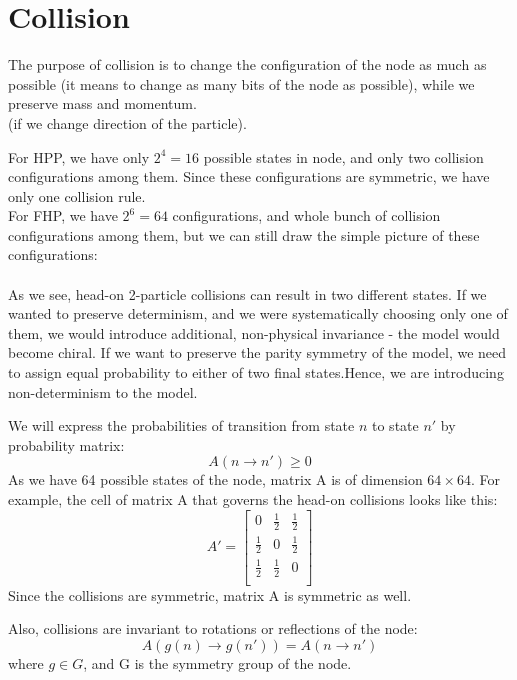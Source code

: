 \section{Collision}
The purpose of collision is to change the configuration of the node as much as possible (it means to change as many bits of the node as possible), while we preserve mass and momentum.\\
(if we change direction of the particle). 

For HPP, we have only $2^4 = 16$ possible states in node, and only two collision configurations among them. Since these configurations are symmetric, we have only one collision rule.\\
For FHP, we have $2^6 = 64$ configurations, and whole bunch of collision configurations among them, but we can still draw the simple picture of these configurations:\\
\\
As we see, head-on 2-particle collisions can result in two different states. If we wanted to preserve determinism, and we were systematically choosing only one of them, we would introduce additional, non-physical invariance - the model would become chiral. If we want to preserve the parity symmetry of the model, we need to assign equal probability to either of two final states.Hence, we are introducing non-determinism to the model.

We will express the probabilities of transition from state $n$ to state $n'$ by probability matrix:
\begin{equation}
A(n \rightarrow n') \geq 0
\end{equation}
As we have 64 possible states of the node, matrix A is of dimension $64\times 64$.
For example, the cell of matrix A that governs the head-on collisions looks like this:
\[
 A'=
  \begin{bmatrix}
    0 & \frac{1}{2} & \frac{1}{2} \\
    \frac{1}{2} & 0 & \frac{1}{2} \\
    \frac{1}{2} & \frac{1}{2} & 0 \\
  \end{bmatrix}
\]
Since the collisions are symmetric, matrix A is symmetric as well.

Also, collisions are invariant to rotations or reflections of the node:
\begin{equation}
A(g(n) \rightarrow g(n')) = A(n \rightarrow n')
\end{equation}
where $g \in G$, and G is the symmetry group of the node.

